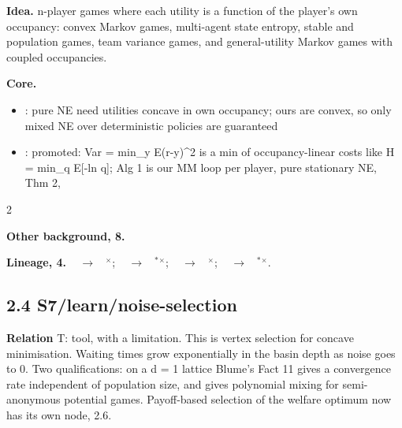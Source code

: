 \documentclass[10pt]{article}
\newcommand{\memb}[1]{\par\smallskip\textbf{#1}\quad}
\begin{document}
\textbf{Idea.} n-player games where each utility is a function of the player's own occupancy: convex Markov games, multi-agent state entropy, stable and population games, team variance games, and general-utility Markov games with coupled occupancies.

\memb{Core.}
\begin{itemize}[nosep,leftmargin=1.2em]
\item \citet{Gemp-convex24}: pure NE need utilities concave in own occupancy; ours are convex, so only mixed NE over deterministic policies are guaranteed
\item \citet{Xia-team25}: promoted: Var = min\_y E(r-y)\^{}2 is a min of occupancy-linear costs like H = min\_q E[-ln q]; Alg 1 is our MM loop per player, pure stationary NE, Thm 2,
\end{itemize}
\begin{multicols}{2}
\memb{Other background, 8.} {\footnotesize \citetext{\citealp{Nash-non51}\dag; \citealp{Hofbauer-stable09}; \citealp{Sandholm-population15}; \citealp{Tao-multi23}; \citealp{Ying-scalable23}; \citealp{Kalogiannis-solving25}; \citealp{Zamboni-towards25}; \citealp{Barakat-convex26}}}

\end{multicols}
\memb{Lineage, 4.} {\footnotesize \citeauthor{Sobel-variance82}~\citeyear{Sobel-variance82} $\to$ \citeauthor{Xia-team25}~\citeyear{Xia-team25}$^\times$; \citeauthor{Hazan-provably19}~\citeyear{Hazan-provably19} $\to$ \citeauthor{Gemp-convex24}~\citeyear{Gemp-convex24}$^\ast$$^\times$; \citeauthor{Bisi-riskaverse20}~\citeyear{Bisi-riskaverse20} $\to$ \citeauthor{Xia-team25}~\citeyear{Xia-team25}$^\times$; \citeauthor{Geist-concave22}~\citeyear{Geist-concave22} $\to$ \citeauthor{Gemp-convex24}~\citeyear{Gemp-convex24}$^\ast$$^\times$.}

\subsection{2.4 S7/learn/noise-selection}\label{node:S7-S7-learn-noise-selection}
\textbf{Relation} \textsf{T}: tool, with a limitation. This is vertex selection for concave minimisation. Waiting times grow exponentially in the basin depth as noise goes to 0. Two qualifications: on a d = 1 lattice Blume's Fact 11 gives a convergence rate independent of population size, and \citet{Borowski-fast17} gives polynomial mixing for semi-anonymous potential games. Payoff-based selection of the welfare optimum now has its own node, 2.6.
\end{document}
